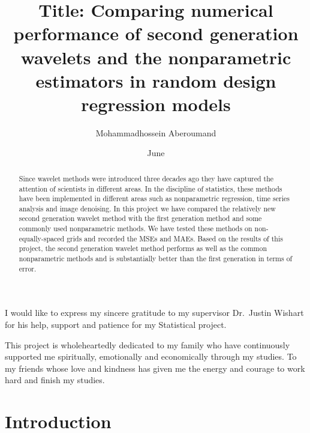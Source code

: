 \documentclass[12pt,twoside, a4paper]{reedthesis}
\title{Title: Comparing numerical performance of second generation wavelets and the nonparametric estimators in random design regression models}
\author{Mohammadhossein Aberoumand}
\date{June}
\begin{document}
  \maketitle


\frontmatter %
\pagestyle{headings} %
  \begin{acknowledgements}
    I would like to express my sincere gratitude to my supervisor Dr.~Justin Wishart for his help, support and patience for my Statistical project.
  \end{acknowledgements}
  \begin{abstract}
    Since wavelet methods were introduced three decades ago they have captured the attention of scientists in different areas. In the discipline of statistics, these methods have been implemented in different areas such as nonparametric regression, time series analysis and image denoising. In this project we have compared the relatively new second generation wavelet method with the first generation method and some commonly used nonparametric methods. We have tested these methods on non-equally-spaced grids and recorded the MSEs and MAEs. Based on the results of this project, the second generation wavelet method performs as well as the common nonparametric methods and is substantially better than the first generation in terms of error.
  \end{abstract}



  \hypersetup{linkcolor=black}
  \setcounter{tocdepth}{2}
  \tableofcontents




  \begin{dedication}
    This project is wholeheartedly dedicated to my family who have continuously supported me spiritually, emotionally and economically through my studies.
    To my friends whose love and kindness has given me the energy and courage to work hard and finish my studies.
  \end{dedication}
\mainmatter %
\pagestyle{fancyplain} %

\hypertarget{introduction}{%
\chapter{Introduction}\label{introduction}}
\end{document}
